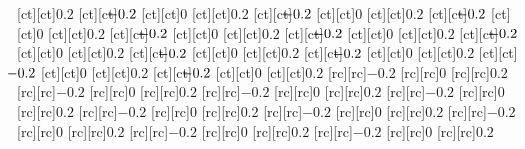 [ct][ct]{\matlabtextA $0.2$}%
[ct][ct]{\matlabtextA $\matlabfragNegXTick 0.2$}%
[ct][ct]{\matlabtextA $0$}%
[ct][ct]{\matlabtextA $0.2$}%
[ct][ct]{\matlabtextA $\matlabfragNegXTick 0.2$}%
[ct][ct]{\matlabtextA $0$}%
[ct][ct]{\matlabtextA $0.2$}%
[ct][ct]{\matlabtextA $\matlabfragNegXTick 0.2$}%
[ct][ct]{\matlabtextA $0$}%
[ct][ct]{\matlabtextA $0.2$}%
[ct][ct]{\matlabtextA $\matlabfragNegXTick 0.2$}%
[ct][ct]{\matlabtextA $0$}%
[ct][ct]{\matlabtextA $0.2$}%
[ct][ct]{\matlabtextA $\matlabfragNegXTick 0.2$}%
[ct][ct]{\matlabtextA $0$}%
[ct][ct]{\matlabtextA $0.2$}%
[ct][ct]{\matlabtextA $\matlabfragNegXTick 0.2$}%
[ct][ct]{\matlabtextA $0$}%
[ct][ct]{\matlabtextA $0.2$}%
[ct][ct]{\matlabtextA $\matlabfragNegXTick 0.2$}%
[ct][ct]{\matlabtextA $0$}%
[ct][ct]{\matlabtextA $0.2$}%
[ct][ct]{\matlabtextA $\matlabfragNegXTick 0.2$}%
[ct][ct]{\matlabtextA $0$}%
[ct][ct]{\matlabtextA $0.2$}%
[ct][ct]{\matlabtextA $\matlabfragNegXTick 0.2$}%
[ct][ct]{\matlabtextA $0$}%
[ct][ct]{\matlabtextA $0.2$}%
[ct][ct]{\matlabtextA $\matlabfragNegXTick 0.2$}%
[ct][ct]{\matlabtextA $0$}%
[ct][ct]{\matlabtextA $0.2$}%
%
%
%
[rc][rc]{\matlabtextA $-0.2$}%
[rc][rc]{\matlabtextA $0$}%
[rc][rc]{\matlabtextA $0.2$}%
[rc][rc]{\matlabtextA $-0.2$}%
[rc][rc]{\matlabtextA $0$}%
[rc][rc]{\matlabtextA $0.2$}%
[rc][rc]{\matlabtextA $-0.2$}%
[rc][rc]{\matlabtextA $0$}%
[rc][rc]{\matlabtextA $0.2$}%
[rc][rc]{\matlabtextA $-0.2$}%
[rc][rc]{\matlabtextA $0$}%
[rc][rc]{\matlabtextA $0.2$}%
[rc][rc]{\matlabtextA $-0.2$}%
[rc][rc]{\matlabtextA $0$}%
[rc][rc]{\matlabtextA $0.2$}%
[rc][rc]{\matlabtextA $-0.2$}%
[rc][rc]{\matlabtextA $0$}%
[rc][rc]{\matlabtextA $0.2$}%
[rc][rc]{\matlabtextA $-0.2$}%
[rc][rc]{\matlabtextA $0$}%
[rc][rc]{\matlabtextA $0.2$}%
[rc][rc]{\matlabtextA $-0.2$}%
[rc][rc]{\matlabtextA $0$}%
[rc][rc]{\matlabtextA $0.2$}%
[rc][rc]{\matlabtextA $-0.2$}%
[rc][rc]{\matlabtextA $0$}%
[rc][rc]{\matlabtextA $0.2$}%
